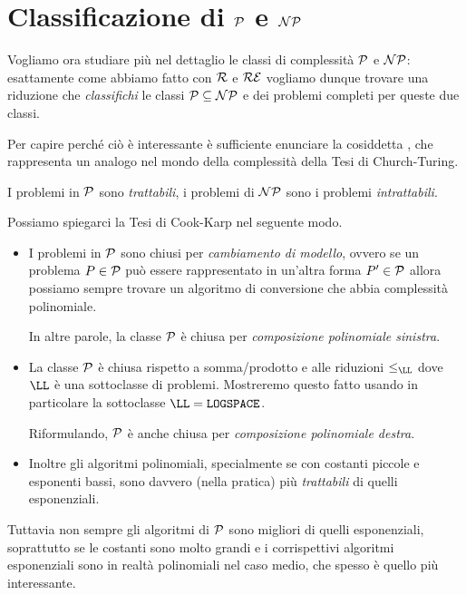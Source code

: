 \section{Classificazione di \texorpdfstring{$\P$ e $\NP$}{P e NP}}

Vogliamo ora studiare più nel dettaglio le classi di complessità $\P$ e $\NP$:
esattamente come abbiamo fatto con $\R$ e $\RE$ vogliamo dunque trovare una
riduzione che \emph{classifichi} le classi $\P \subseteq \NP$ e dei problemi
completi per queste due classi.

Per capire perché ciò è interessante è sufficiente enunciare la cosiddetta
, che rappresenta un analogo nel mondo della
complessità della Tesi di Church-Turing.

\begin{theorem}
  I problemi in $\P$ sono \emph{trattabili}, 
  i problemi di $\NP$ sono i problemi \emph{intrattabili}. 
\end{theorem}

Possiamo spiegarci la Tesi di Cook-Karp nel seguente modo. \begin{itemize}
  \item I problemi in $\P$ sono chiusi per \emph{cambiamento di
  modello}, ovvero se un problema $P \in \P$ può essere rappresentato in un'altra
  forma $P' \in \P$ allora possiamo sempre trovare un algoritmo di conversione 
  che abbia complessità polinomiale.

  In altre parole, la classe $\P$ è chiusa per \emph{composizione polinomiale
  sinistra}. 
  \item La classe $\P$ è chiusa rispetto a somma/prodotto e alle riduzioni 
  $\leq_{\LL}$ dove $\LL$ è una sottoclasse di problemi. Mostreremo questo fatto
  usando in particolare la sottoclasse $\LL = \LOGSPACE$.

  Riformulando, $\P$ è anche chiusa per \emph{composizione polinomiale destra}.
  \item Inoltre gli algoritmi polinomiali, specialmente se con costanti piccole
  e esponenti bassi, sono davvero (nella pratica) più \emph{trattabili} di
  quelli esponenziali.
\end{itemize}

Tuttavia non sempre gli algoritmi di $\P$ sono migliori di quelli esponenziali, 
soprattutto se le costanti sono molto grandi e i corrispettivi algoritmi 
esponenziali sono in realtà polinomiali nel caso medio, che spesso è quello più
interessante.

